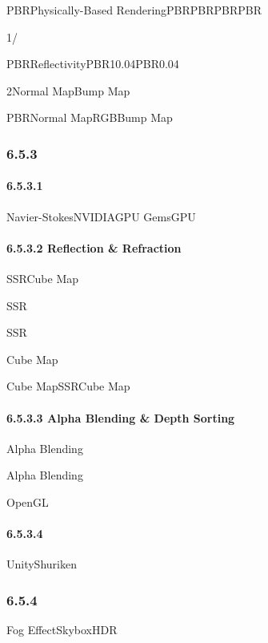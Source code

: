 PBRPhysically-Based RenderingPBRPBRPBRPBR

1/

PBRReflectivityPBR10.04PBR0.04

2Normal MapBump Map

PBRNormal MapRGBBump Map

\hypertarget{section-111}{%
\subsubsection{6.5.3}\label{section-111}}

\hypertarget{section-112}{%
\paragraph{6.5.3.1}\label{section-112}}

Navier-StokesNVIDIAGPU GemsGPU

\hypertarget{reflection-refraction}{%
\paragraph{6.5.3.2 Reflection \&
Refraction}\label{reflection-refraction}}

SSRCube Map

SSR

SSR

Cube Map

Cube MapSSRCube Map

\hypertarget{alpha-blending-depth-sorting}{%
\paragraph{6.5.3.3 Alpha Blending \& Depth
Sorting}\label{alpha-blending-depth-sorting}}

Alpha Blending

Alpha Blending

OpenGL

\hypertarget{section-113}{%
\paragraph{6.5.3.4}\label{section-113}}

UnityShuriken

\hypertarget{section-114}{%
\subsubsection{6.5.4}\label{section-114}}

Fog EffectSkyboxHDR

